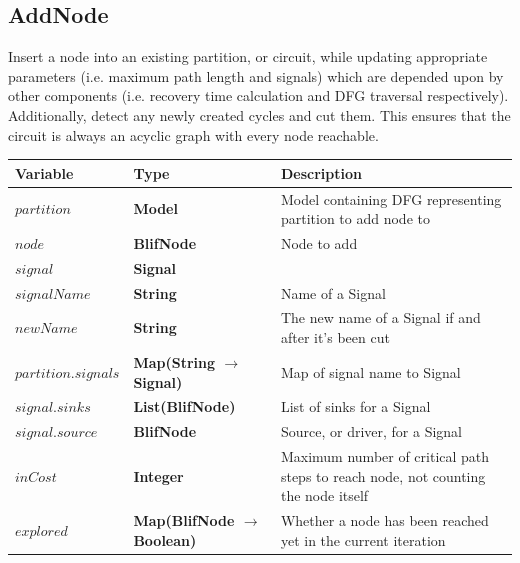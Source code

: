 \documentclass[12pt,final,oneside,a4paper]{dwThesis} %
\begin{document}
   \subsection{AddNode}
   Insert a node into an existing partition, or
   circuit, while updating appropriate parameters (i.e. maximum path length and
   signals) which are depended upon by other components (i.e. recovery time
   calculation and \gls{DFG} traversal respectively).  Additionally, detect any
   newly created cycles and cut them.  This ensures that the circuit is always
   an acyclic graph with every node reachable.  
   \begin{algorithm}


      \begin{center}

         \begin{tabularx}
            {\linewidth}{llX} \toprule Variable & Type
            & Description\\
            \midrule $partition$ &\textbf{Model } &  Model
            containing DFG representing partition to add node to\\
            $node$
            &\textbf{BlifNode } &  Node to add\\
            $signal$ &\textbf{Signal
            } &  \\
            $signalName$ &\textbf{String } &  Name of a Signal\\

            $newName$ &\textbf{String } &  The new name of a Signal if and
            after it's been cut\\
            $partition.signals$ &\textbf{Map(String
               $\to$ Signal) } &  Map of signal name to Signal \\

            $signal.sinks$ &\textbf{List(BlifNode) } &  List of sinks for a
            Signal \\
            $signal.source$ &\textbf{BlifNode } &  Source, or
            driver, for a Signal \\
            $inCost$ &\textbf{Integer } &  Maximum
            number of critical path steps to reach node, not counting the node
            itself \\
            $explored$ &\textbf{Map(BlifNode $\to$ Boolean) } &
            Whether a node has been reached yet in the current iteration \\

            \bottomrule 
         \end{tabularx}


\end{center}
\end{algorithm}
\end{document}
